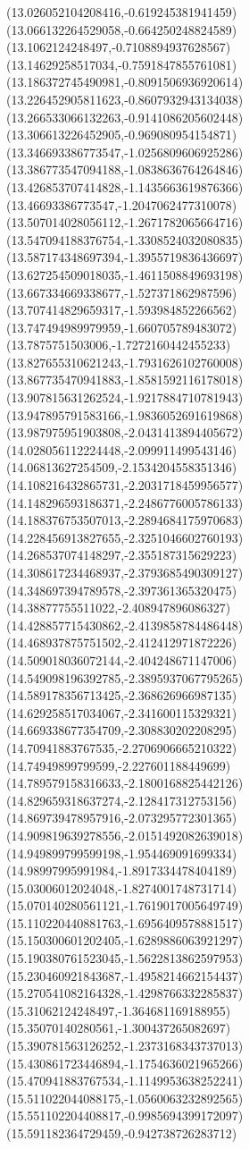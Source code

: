 {(13.026052104208416,-0.619245381941459)
(13.066132264529058,-0.664250248824589)
(13.1062124248497,-0.7108894937628567)
(13.14629258517034,-0.7591847855761081)
(13.186372745490981,-0.8091506936920614)
(13.226452905811623,-0.8607932943134038)
(13.266533066132263,-0.9141086205602448)
(13.306613226452905,-0.969080954154871)
(13.346693386773547,-1.0256809606925286)
(13.386773547094188,-1.0838636764264846)
(13.426853707414828,-1.1435663619876366)
(13.46693386773547,-1.2047062477310078)
(13.507014028056112,-1.2671782065664716)
(13.547094188376754,-1.3308524032080835)
(13.587174348697394,-1.3955719836436697)
(13.627254509018035,-1.4611508849693198)
(13.667334669338677,-1.527371862987596)
(13.707414829659317,-1.593984852266562)
(13.747494989979959,-1.660705789483072)
(13.7875751503006,-1.7272160442455233)
(13.827655310621243,-1.7931626102760008)
(13.867735470941883,-1.8581592116178018)
(13.907815631262524,-1.9217884710781943)
(13.947895791583166,-1.9836052691619868)
(13.987975951903808,-2.0431413894405672)
(14.028056112224448,-2.099911499543146)
(14.06813627254509,-2.1534204558351346)
(14.108216432865731,-2.2031718459956577)
(14.148296593186371,-2.2486776005786133)
(14.188376753507013,-2.2894684175970683)
(14.228456913827655,-2.3251046602760193)
(14.268537074148297,-2.355187315629223)
(14.308617234468937,-2.3793685490309127)
(14.348697394789578,-2.397361365320475)
(14.38877755511022,-2.408947896086327)
(14.428857715430862,-2.4139858784486448)
(14.468937875751502,-2.412412971872226)
(14.509018036072144,-2.404248671147006)
(14.549098196392785,-2.3895937067795265)
(14.589178356713425,-2.368626966987135)
(14.629258517034067,-2.341600115329321)
(14.669338677354709,-2.308830202208295)
(14.70941883767535,-2.2706906665210322)
(14.74949899799599,-2.227601188449699)
(14.789579158316633,-2.1800168825442126)
(14.829659318637274,-2.128417312753156)
(14.869739478957916,-2.073295772301365)
(14.909819639278556,-2.0151492082639018)
(14.949899799599198,-1.954469091699334)
(14.98997995991984,-1.8917334478404189)
(15.03006012024048,-1.8274001748731714)
(15.070140280561121,-1.7619017005649749)
(15.110220440881763,-1.6956409578881517)
(15.150300601202405,-1.6289886063921297)
(15.190380761523045,-1.5622813862597953)
(15.230460921843687,-1.4958214662154437)
(15.270541082164328,-1.4298766332285837)
(15.31062124248497,-1.364681169188955)
(15.35070140280561,-1.300437265082697)
(15.390781563126252,-1.2373168343737013)
(15.430861723446894,-1.1754636021965266)
(15.470941883767534,-1.1149953638252241)
(15.511022044088175,-1.0560063232892565)
(15.551102204408817,-0.9985694399172097)
(15.591182364729459,-0.942738726283712)
}
